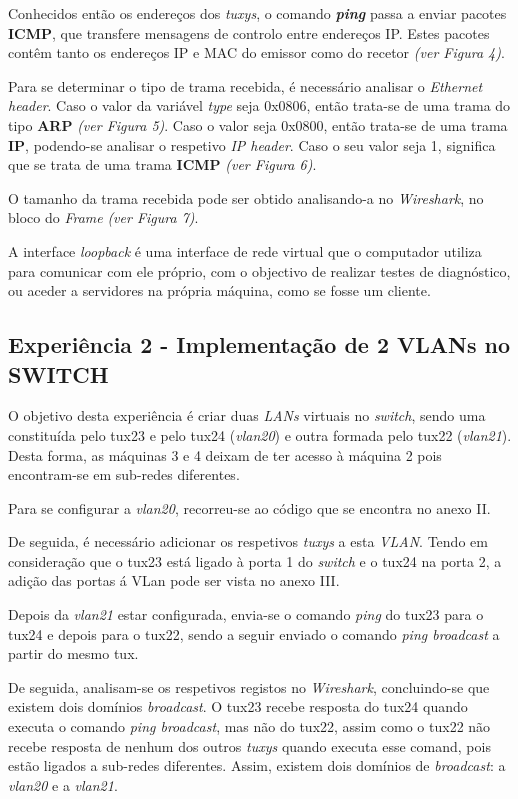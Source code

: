 \documentclass[11pt]{article}
\begin{document}
Conhecidos então os endereços dos \textit{tuxys}, o comando \textit{\textbf{ping}} passa a enviar pacotes \textbf{ICMP}, que transfere mensagens de controlo entre endereços IP. Estes pacotes contêm tanto os endereços IP e MAC do emissor como do recetor \textit{(ver Figura 4)}.

Para se determinar o tipo de trama recebida, é necessário analisar o \textit{Ethernet header}. Caso o valor da variável \textit{type} seja 0x0806, então trata-se de uma trama do tipo \textbf{ARP} \textit{(ver Figura 5)}. Caso o valor seja 0x0800, então trata-se de uma trama \textbf{IP}, podendo-se analisar o respetivo \textit{IP header}. Caso o seu valor seja 1, significa que se trata de uma trama \textbf{ICMP} \textit{(ver Figura 6)}.

O tamanho da trama recebida pode ser obtido analisando-a no \textit{Wireshark}, no bloco do \textit{Frame} \textit{(ver Figura 7)}.

A interface \textit{loopback} é uma interface de rede virtual que o computador utiliza para comunicar com ele próprio, com o objectivo de realizar testes de diagnóstico, ou aceder a servidores na própria máquina, como se fosse um cliente.

\subsection{Experiência 2 - Implementação de 2 VLANs no SWITCH}

O objetivo desta experiência é criar duas \textit{LANs} virtuais no \textit{switch}, sendo uma constituída pelo tux23 e pelo tux24 (\textit{vlan20}) e outra formada pelo tux22 (\textit{vlan21}). Desta forma, as máquinas 3 e 4 deixam de ter acesso à máquina 2 pois encontram-se em sub-redes diferentes.

Para se configurar a \textit{vlan20}, recorreu-se ao código que se encontra no anexo II.

De seguida, é necessário adicionar os respetivos \textit{tuxys} a esta \textit{VLAN}. Tendo em consideração que o tux23 está ligado à porta 1 do \textit{switch} e o tux24 na porta 2, a adição das portas á VLan pode ser vista no anexo III.

Depois da \textit{vlan21} estar configurada, envia-se o comando \textit{ping} do tux23 para o tux24 e depois para o tux22, sendo a seguir enviado o comando \textit{ping broadcast} a partir do mesmo tux.

De seguida, analisam-se os respetivos registos no \textit{Wireshark}, concluindo-se que existem dois domínios \textit{broadcast}. O tux23 recebe resposta do tux24 quando executa o comando \textit{ping broadcast}, mas não do tux22, assim como o tux22 não recebe resposta de nenhum dos outros \textit{tuxys} quando executa esse comand, pois estão ligados a sub-redes diferentes. Assim, existem dois domínios de \textit{broadcast}: a \textit{vlan20} e a \textit{vlan21}. 
\end{document}
